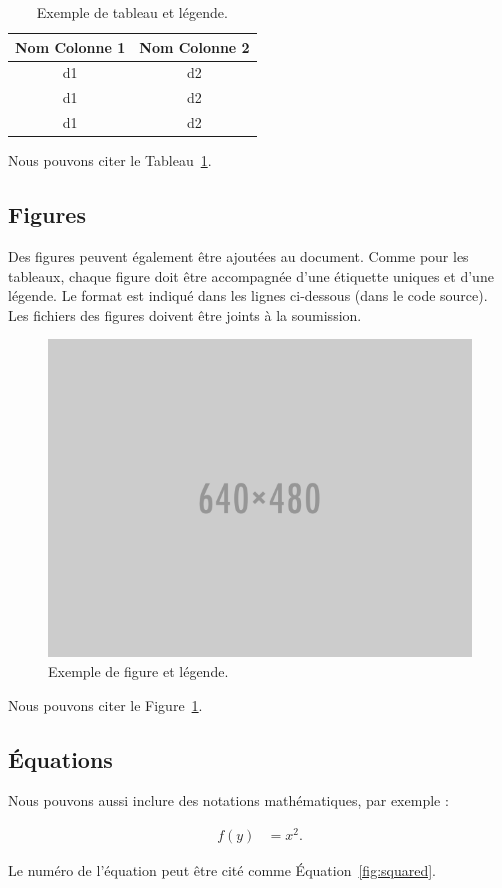 \documentclass[fra]{anthology-ch}         %
\begin{document}
\begin{table}[h]
  \centering 
  \begin{tabular}{cc}
    \toprule
    Nom Colonne 1 & Nom Colonne 2\\
    \midrule
    d1 & d2 \\
    d1 & d2 \\
    d1 & d2 \\
    \bottomrule
  \end{tabular}
  \caption{Exemple de tableau et légende.}
  \label{tab:example}
\end{table}

Nous pouvons citer le Tableau~\ref{tab:example}.

\subsection{Figures}

Des figures peuvent également être ajoutées au document. Comme pour les
tableaux, chaque figure doit être accompagnée d'une étiquette uniques et
d'une légende. Le format est indiqué dans les lignes ci-dessous
(dans le code source). Les fichiers des figures doivent être joints à la
soumission.

\begin{figure}[t!]
  \centering
  \includegraphics[width=0.4\linewidth]{640x480.png}
  \caption{Exemple de figure et légende.}
  \label{fig:example}
\end{figure}

Nous pouvons citer le Figure~\ref{fig:example}.

\subsection{Équations}

Nous pouvons aussi inclure des notations mathématiques, par exemple :

\begin{align}
f(y) &= x^2. \label{fig:squared}
\end{align}

Le numéro de l'équation peut être cité comme Équation~\ref{fig:squared}.
\end{document}
